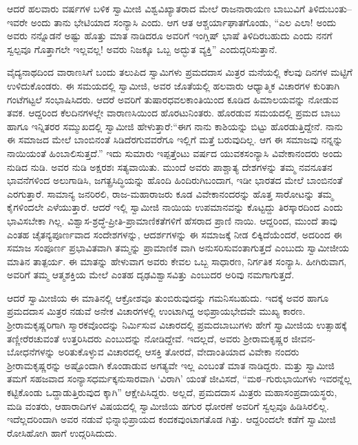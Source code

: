 ಆದರೆ ಹಲವಾರು ವರ್ಷಗಳ ಬಳಿಕ ಸ್ವಾಮೀಜಿ ವಿಶ್ವವಿಖ್ಯಾತರಾದ ಮೇಲೆ ರಾಜನಾರಾಯಣ ಬಾಬುವಿಗೆ ತಿಳಿದುಬಂತು–ಇವರೇ ಅಂದು ತಾನು ಭೇಟಿಯಾದ ಸಂನ್ಯಾಸಿ ಎಂದು. ಆಗ ಆತ ಆಶ್ಚರ್ಯಾಘಾತಗೊಂಡು, “ಎಲ ಎಲಾ! ಅಂದು ಅವರು ನನ್ನೊಡನೆ ಅಷ್ಟು ಹೊತ್ತು ಮಾತ ನಾಡಿದರೂ ಅವರಿಗೆ ಇಂಗ್ಲಿಷ್ ಭಾಷೆ ತಿಳಿದಿರಬಹುದು ಎಂದು ನನಗೆ ಸ್ವಲ್ಪವೂ ಗೊತ್ತಾಗಲೇ ಇಲ್ಲವಲ್ಲ! ಅವರು ನಿಜಕ್ಕೂ ಒಬ್ಬ ಅದ್ಭುತ ವ್ಯಕ್ತಿ” ಎಂದುದ್ಗರಿಸುತ್ತಾನೆ.

ವೈದ್ಯನಾಥದಿಂದ ವಾರಾಣಸಿಗೆ ಬಂದು ತಲುಪಿದ ಸ್ವಾಮಿಗಳು ಪ್ರಮದದಾಸ ಮಿತ್ರರ ಮನೆಯಲ್ಲಿ ಕೆಲವು ದಿನಗಳ ಮಟ್ಟಿಗೆ ಉಳಿದುಕೊಂಡರು. ಈ ಸಮಯದಲ್ಲಿ ಸ್ವಾಮೀಜಿ, ಅವರ ಜೊತೆಯಲ್ಲಿ ಹಲವಾರು ಆಧ್ಯಾತ್ಮಿಕ ವಿಚಾರಗಳ ಕುರಿತಾಗಿ ಗಂಟೆಗಟ್ಟಲೆ ಸಂಭಾಷಿಸಿದರು. ಆದರೆ ಅವರಿಗೆ ತುಷಾರಧವಲಕಾಂತಿಯಿಂದ ಕೂಡಿದ ಹಿಮಾಲಯವನ್ನು ನೋಡುವ ತವಕ. ಆದ್ದರಿಂದ ಕೆಲದಿನಗಳಲ್ಲೇ ವಾರಾಣಸಿಯಿಂದ ಹೊರಟುನಿಂತರು. ಹೊರಡುವ ಸಮಯದಲ್ಲಿ ಪ್ರಮದ ಬಾಬು ಹಾಗೂ ಇನ್ನಿತರರ ಸಮ್ಮುಖದಲ್ಲಿ ಸ್ವಾಮೀಜಿ ಹೇಳುತ್ತಾರೆ:“ಈಗ ನಾನು ಕಾಶಿಯನ್ನು ಬಿಟ್ಟು ಹೊರಡುತ್ತಿದ್ದೇನೆ. ನಾನು ಈ ಸಮಾಜದ ಮೇಲೆ ಬಾಂಬಿನಂತೆ ಸಿಡಿದೆರಗುವವರೆಗೂ ಇಲ್ಲಿಗೆ ಮತ್ತೆ ಬರುವುದಿಲ್ಲ. ಆಗ ಈ ಸಮಾಜವು ನನ್ನನ್ನು ನಾಯಿಯಂತೆ ಹಿಂಬಾಲಿಸುತ್ತದೆ.” ಇದು ಸುಮಾರು ಇಪ್ಪತ್ತೆಂಟು ವರ್ಷದ ಯುವಕಸಂನ್ಯಾಸಿ ವಿವೇಕಾನಂದರು ಅಂದು ನುಡಿದ ನುಡಿ. ಅವರ ನುಡಿ ಅಕ್ಷರಶಃ ಸತ್ಯವಾಯಿತು. ಮುಂದೆ ಅವರು ಪಾಶ್ಚಾತ್ಯ ದೇಶಗಳನ್ನು ತಮ್ಮ ನವನೂತನ ಭಾವನೆಗಳಿಂದ ಅಲುಗಾಡಿಸಿ, ಜಗತ್ಪ್ರಸಿದ್ಧಿಯನ್ನು ಹೊಂದಿ ಹಿಂದಿರುಗಿಬಂದಾಗ, ಇಡೀ ಭಾರತದ ಮೇಲೆ ಬಾಂಬಿನಂತೆ ಎರಗುತ್ತಾರೆ. ಸಾಮಾನ್ಯ ಜನರಿರಲಿ, ರಾಜ-ಮಹಾರಾಜರು ಕೂಡ ವಿವೇಕಾನಂದರನ್ನು ಹೊತ್ತ ಸಾರೋಟನ್ನು ತಮ್ಮ ಕೈಗಳಿಂದಲೇ ಎಳೆಯುತ್ತಾರೆ. ಆದರೆ ಇಲ್ಲಿ ಸ್ವಾಮೀಜಿ ನಾಯಿಯ ಉಪಮಾನವನ್ನು ಕೊಟ್ಟದ್ದು ತಿರಸ್ಕಾರದಿಂದ ಎಂದು ಭಾವಿಸಬೇಕಾ ಗಿಲ್ಲ. ವಿಶ್ವಾಸ-ಶ್ರದ್ಧೆ-ಪ್ರೀತಿ-ಪ್ರಾಮಾಣಿಕತೆಗಳಿಗೆ ಹೆಸರಾದ ಪ್ರಾಣಿ ನಾಯಿ. ಆದ್ದರಿಂದ, ಮುಂದೆ ತಾವು ಎಂತಹ ಚೈತನ್ಯಪೂರ್ಣವಾದ ಸಂದೇಶಗಳನ್ನು, ಆದರ್ಶಗಳನ್ನು ಈ ಸಮಾಜಕ್ಕೆ ನೀಡ ಲಿಕ್ಕಿದೆಯೆಂದರೆ, ಅದರಿಂದ ಈ ಸಮಾಜ ಸಂಪೂರ್ಣ ಪ್ರಭಾವಿತವಾಗಿ ತಮ್ಮನ್ನು ಪ್ರಾಮಾಣಿಕ ವಾಗಿ ಅನುಸರಿಸುವಂತಾಗುತ್ತದೆ ಎಂಬುದು ಸ್ವಾಮೀಜೀಯ ಮಾತಿನ ತಾತ್ಪರ್ಯ. ಈ ಮಾತನ್ನು ಹೇಳುವಾಗ ಅವರು ಕೇವಲ ಒಬ್ಬ ಸಾಧಾರಣ, ನಿರ್ಗತಿಕ ಸಂನ್ಯಾಸಿ. ಹೀಗಿರುವಾಗ, ಅವರಿಗೆ ತಮ್ಮ ಆತ್ಮಶಕ್ತಿಯ ಮೇಲೆ ಎಂತಹ ದೃಢವಿಶ್ವಾಸವಿತ್ತು ಎಂಬುದರ ಅರಿವು ನಮಗಾಗುತ್ತದೆ.

ಆದರೆ ಸ್ವಾಮೀಜಿಯ ಈ ಮಾತಿನಲ್ಲಿ ಆಕ್ರೋಶವೂ ತುಂಬಿರುವುದನ್ನು ಗಮನಿಸಬಹುದು. ಇದಕ್ಕೆ ಅವರ ಹಾಗೂ ಪ್ರಮದದಾಸ ಮಿತ್ರರ ನಡುವೆ ಅನೇಕ ವಿಚಾರಗಳಲ್ಲಿ ಉಂಟಾಗಿದ್ದ ಅಭಿಪ್ರಾಯಭೇದವೇ ಮುಖ್ಯ ಕಾರಣ. ಶ್ರೀರಾಮಕೃಷ್ಣರಿಗಾಗಿ ಸ್ಮಾರಕವೊಂದನ್ನು ನಿರ್ಮಿಸುವ ವಿಚಾರದಲ್ಲಿ ಪ್ರಮದಬಾಬುಗಳು ಹೇಗೆ ಸ್ವಾಮೀಜಿಯ ಉತ್ಸಾಹಕ್ಕೆ ತಣ್ಣೀರೆರಚುವಂತೆ ಉತ್ತರಿಸಿದರು ಎಂಬುದನ್ನು ನೋಡಿದ್ದೇವೆ. ಇದಲ್ಲದೆ, ಅವರು ಶ್ರೀರಾಮಕೃಷ್ಣರ ಜೀವನ- ಬೋಧನೆಗಳನ್ನು ಅರಿತುಕೊಳ್ಳುವ ವಿಚಾರದಲ್ಲಿ ಆಸಕ್ತಿ ತೋರದೆ, ವೇದಾಂತಿಯಾದ ವಿವೇಕಾ ನಂದರು ಶ್ರೀರಾಮಕೃಷ್ಣರನ್ನು ಅಷ್ಟೊಂದಾಗಿ ಕೊಂಡಾಡುವ ಅಗತ್ಯವೇ ಇಲ್ಲ ಎಂಬಂತೆ ಮಾತ ನಾಡಿದ್ದರು. ಮತ್ತು ಸ್ವಾಮೀಜಿ ತಮಗೆ ಸಹಜವಾದ ಸಂನ್ಯಾಸಧರ್ಮಕ್ಕನುಸಾರವಾಗಿ ‘ವಿರಾಗಿ’ ಯಂತೆ ಜೀವಿಸದೆ, “ಮಠ--ಗುರುಭಾಯಿಗಳು ಇವರನ್ನೆಲ್ಲ ಕಟ್ಟಿಕೊಂಡು ಒದ್ದಾಡುತ್ತಿರುವುದ ಕ್ಕಾಗಿ” ಆಕ್ಷೇಪಿಸಿದ್ದರು. ಅಲ್ಲದೆ, ಪ್ರಮದದಾಸ ಮಿತ್ರರು ಮಹಾಸಂಪ್ರದಾಯಸ್ಥರು, ಮಡಿ ವಂತರು, ಆಹಾರಾದಿಗಳ ವಿಷಯದಲ್ಲಿ ಸ್ವಾಮೀಜಿಯ ಹಗುರ ಧೋರಣೆ ಅವರಿಗೆ ಸ್ವಲ್ಪವೂ ಹಿಡಿಸಿರಲಿಲ್ಲ. ಇದೆಲ್ಲದರಿಂದಾಗಿ ಅವರ ನಡುವೆ ಭಿನ್ನಾಭಿಪ್ರಾಯದ ಕಂದಕವುಂಟಾಗತೊಡ ಗಿತ್ತು. ಆದ್ದರಿಂದಲೇ ಕಡೆಗೆ ಸ್ವಾಮೀಜಿ ರೋಸಿಹೋಗಿ ಹಾಗೆ ಉದ್ಗರಿಸಿದುದು.

